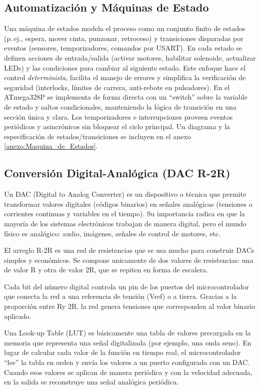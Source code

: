 \subsection{Automatización y Máquinas de Estado}
Una máquina de estados modela el proceso como un conjunto finito de estados (p.\,ej., espera, mover cinta, punzonar, retroceso) y transiciones disparadas por eventos (sensores, temporizadores, comandos por USART). En cada estado se definen acciones de entrada/salida (activar motores, habilitar solenoide, actualizar LEDs) y las condiciones para cambiar al siguiente estado. Este enfoque hace el control \textit{determinista}, facilita el manejo de errores y simplifica la verificación de seguridad (interlocks, límites de carrera, anti-rebote en pulsadores). En el ATmega328P se implementa de forma directa con un “switch” sobre la variable de estado y saltos condicionales, manteniendo la lógica de transición en una sección única y clara. Los temporizadores e interrupciones proveen eventos periódicos y asincrónicos sin bloquear el ciclo principal. Un diagrama y la especificación de estados/transiciones se incluyen en el anexo \ref{anexo:Maquina_de_Estados}.


\subsection{Conversión Digital-Analógica (DAC R-2R)}
Un DAC (Digital to Analog Converter) es un dispositivo o técnica que permite transformar valores digitales (códigos binarios) en señales analógicas (tensiones o corrientes continuas y variables en el tiempo). Su importancia radica en que la mayoría de los sistemas electrónicos trabajan de manera digital, pero el mundo físico es analógico: audio, imágenes, señales de control de motores, etc.

El arreglo R-2R es una red de resistencias que se usa mucho para construir DACs simples y económicos. Se compone unicamente de dos valores de resistencias: una de valor R y otra de valor 2R, que se repiten en forma de escalera.

Cada bit del número digital controla un pin de los puertos del microcontrolador que conecta la red a una referencia de tensión (Vref) o a tierra. Gracias a la proporción entre Ry 2R, la red genera tensiones que corresponden al valor binario aplicado.

Una Look-up Table (LUT) es básicamente una tabla de valores precargada en la memoria que representa una señal digitalizada (por ejemplo, una onda seno). En lugar de calcular cada valor de la función en tiempo real, el microcontrolador ``lee'' la tabla en orden y envía los valores a un puerto configurado con un DAC. Cuando esos valores se aplican de manera periódica y con la velocidad adecuada, en la salida se reconstruye una señal analógica periódica.
    

